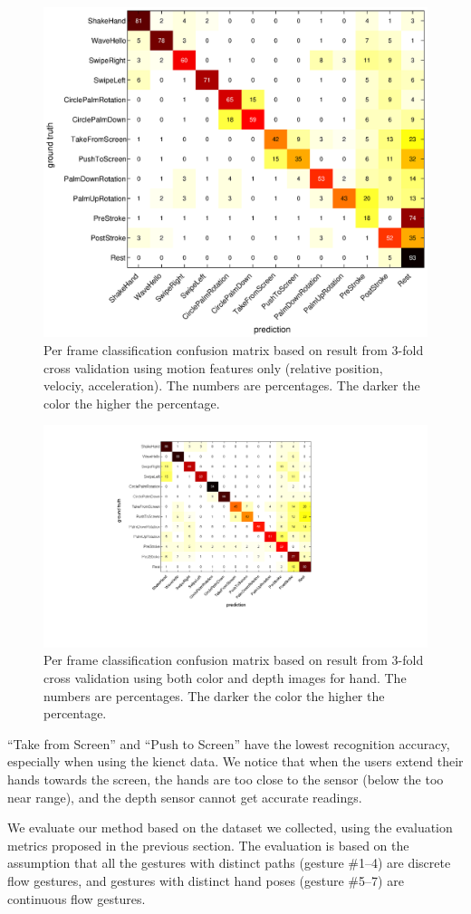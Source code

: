 \begin{figure}[h]
\centering
\includegraphics[trim={6cm 3.5cm 10cm 1.5cm}, clip,
width=0.6\columnwidth]{figures/confusion_motion.eps} \caption{Per frame
classification confusion matrix based on result from 3-fold cross validation
using motion features only (relative position, velociy, acceleration). The
numbers are percentages.
The darker the color the higher the percentage.}
\label{fig:confusion}
\end{figure}

\begin{figure}[tb]
\centering
\includegraphics[trim={6cm 3.5cm 10cm 1.5cm}, clip,
width=0.6\columnwidth]{figures/confusion_color_depth.png} \caption{Per frame
classification confusion matrix based on result from 3-fold cross validation using 
both color and depth images for hand. The numbers are percentages. The darker
the color the higher the percentage.}
\label{fig:confusion}
\end{figure}

``Take from Screen'' and ``Push to Screen'' have the lowest recognition
accuracy, especially when using the kienct data. We notice that when the users
extend their hands towards the screen, the hands are too close to the sensor
(below the too near range), and the depth sensor cannot get accurate readings.

We evaluate our method based on the dataset we collected, using the
evaluation metrics proposed in the previous section. The evaluation is based
on the assumption that all the gestures with distinct paths (gesture \#1--4)
are discrete flow gestures, and gestures with distinct hand poses (gesture
\#5--7) are continuous flow gestures. 

